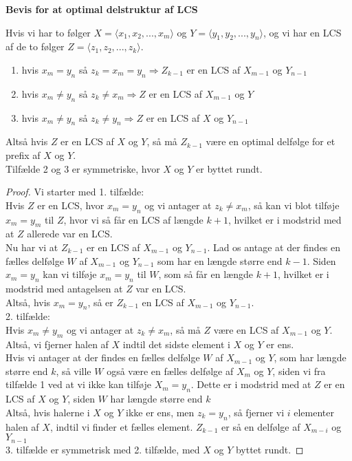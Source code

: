 \textbf{Bevis for at optimal delstruktur af LCS}\\
\begin{theorem}
Hvis vi har to følger $X = \langle x_1, x_2, ..., x_m \rangle$ og $Y = \langle y_1, y_2, ..., y_n \rangle$, og vi har en LCS af de to følger $Z = \langle z_1, z_2, ..., z_k\rangle$.
\begin{enumerate}
\item hvis $x_m = y_n$ så $z_k = x_m = y_n \Rightarrow Z_{k-1}$ er en LCS af $X_{m-1}$ og $Y_{n-1}$
\item hvis $x_m \neq y_n$ så $z_k \neq x_m \Rightarrow Z$ er en LCS af $X_{m-1}$ og $Y$
\item hvis $x_m \neq y_n$ så $z_k \neq y_n \Rightarrow Z$ er en LCS af $X$ og $Y_{n-1}$
\end{enumerate}
\end{theorem}
Altså hvis $Z$ er en LCS af $X$ og $Y$, så må $Z_{k-1}$ være en optimal delfølge for et prefix af $X$ og $Y$. \\

Tilfælde 2 og 3 er symmetriske, hvor $X$ og $Y$ er byttet rundt.\\
\begin{proof}
Vi starter med 1. tilfælde:\\
Hvis $Z$ er en LCS, hvor $x_m = y_n$ og vi antager at $z_k \neq x_m$, så kan vi blot tilføje $x_m = y_m$ til $Z$, hvor vi så får en LCS af længde $k + 1$, hvilket er i modstrid med at $Z$ allerede var en LCS.\\
Nu har vi at $Z_{k-1}$ er en LCS af $X_{m-1}$ og $Y_{n-1}$. Lad os antage at der findes en fælles delfølge $W$ af $X_{m-1}$ og $Y_{n-1}$ som har en længde større end $k - 1$. Siden $x_m = y_n$ kan vi tilføje $x_m = y_n$ til $W$, som så får en længde $k + 1$, hvilket er i modstrid med antagelsen at $Z$ var en LCS.\\
Altså, hvis $x_m = y_n$, så er $Z_{k-1}$ en LCS af $X_{m-1}$ og $Y_{n-1}$.\\

2. tilfælde:\\
Hvis $x_m \neq y_m$ og vi antager at $z_k \neq x_m$, så må $Z$ være en LCS af $X_{m-1}$ og $Y$. Altså, vi fjerner halen af $X$ indtil det sidste element i $X$ og $Y$ er ens.\\
Hvis vi antager at der findes en fælles delfølge $W$ af $X_{m-1}$ og $Y$, som har længde større end $k$, så ville $W$ også være en fælles delfølge af $X_m$ og $Y$, siden vi fra tilfælde 1 ved at vi ikke kan tilføje $X_m=y_n$. Dette er i modstrid med at $Z$ er en LCS af $X$ og $Y$, siden $W$ har længde større end $k$\\
Altså, hvis halerne i $X$ og $Y$ ikke er ens, men $z_k=y_n$, så fjerner vi $i$ elementer halen af $X$, indtil vi finder et fælles element. $Z_{k-1}$ er så en delfølge af $X_{m-i}$ og $Y_{n-1}$\\

3. tilfælde er symmetrisk med 2. tilfælde, med $X$ og $Y$ byttet rundt.
\end{proof}

